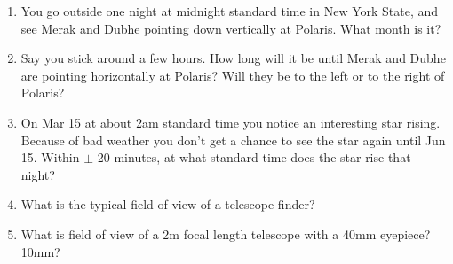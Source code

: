 
\begin{enumerate}
\item You go outside one night at midnight standard time in New York
  State, and see Merak and Dubhe pointing down vertically at
  Polaris. What month is it? 
\vspace{80pt}
\item Say you stick around a few hours.  How long will it be until
  Merak and Dubhe are pointing horizontally at Polaris?  Will they be
  to the left or to the right of Polaris?
\vspace{80pt}
\item On Mar 15 at about 2am standard time you notice an interesting
  star rising.  Because of bad weather you don’t get a chance to see
  the star again until Jun 15.  Within $\pm$ 20 minutes, at what
  standard time does the star rise that night?
\vspace{80pt}
\item What is the typical field-of-view of a telescope finder?
\vspace{80pt}
\item What is field of view of a 2m focal length telescope with a 40mm
  eyepiece? 10mm?
\end{enumerate}
